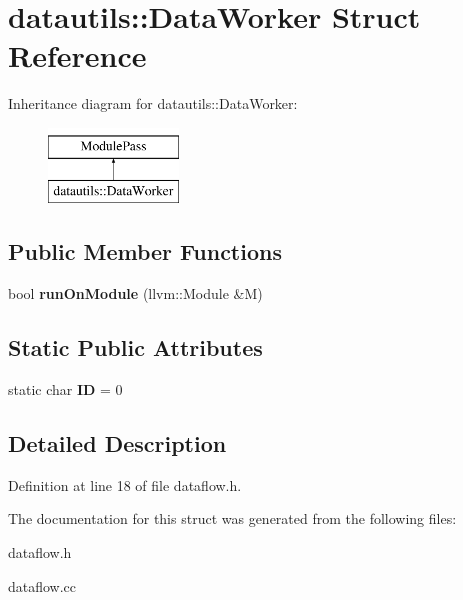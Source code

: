 \hypertarget{structdatautils_1_1DataWorker}{}\section{datautils\+:\+:Data\+Worker Struct Reference}
\label{structdatautils_1_1DataWorker}
Inheritance diagram for datautils\+:\+:Data\+Worker\+:\begin{figure}[H]
\begin{center}
\leavevmode
\includegraphics[height=2.000000cm]{structdatautils_1_1DataWorker}
\end{center}
\end{figure}
\subsection*{Public Member Functions}
\begin{DoxyCompactItemize}
\item 
\hypertarget{structdatautils_1_1DataWorker_ac2b68d9511a0c012c2575dc2bbbe2d15}{}bool {\bfseries run\+On\+Module} (llvm\+::\+Module \&M)\label{structdatautils_1_1DataWorker_ac2b68d9511a0c012c2575dc2bbbe2d15}

\end{DoxyCompactItemize}
\subsection*{Static Public Attributes}
\begin{DoxyCompactItemize}
\item 
\hypertarget{structdatautils_1_1DataWorker_ab2791f26c5f06a2d45ce48df4656467b}{}static char {\bfseries I\+D} = 0\label{structdatautils_1_1DataWorker_ab2791f26c5f06a2d45ce48df4656467b}

\end{DoxyCompactItemize}


\subsection{Detailed Description}


Definition at line 18 of file dataflow.\+h.



The documentation for this struct was generated from the following files\+:\begin{DoxyCompactItemize}
\item 
dataflow.\+h\item 
dataflow.\+cc\end{DoxyCompactItemize}
